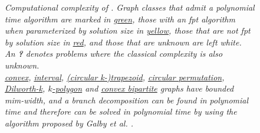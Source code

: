\begin{figure}
    \centering
    \resizebox{1\textwidth}{!}{
        
    }
    \caption[Graph inclusions]{\textit{Computational complexity of \sdom. Graph classes that admit a polynomial time algorithm are marked in {\ul{green}}, those with an fpt algorithm when parameterized by solution size in {\ul{yellow}}, those that are not fpt by solution size in {\ul{red}}, and those that are unknown are left \textit{white}.
    An \textbf{?} denotes problems where the classical complexity is also unknown.\\
    \underline{convex}, \underline{interval}, \underline{(circular k-)trapezoid}, \underline{circular permutation}, \underline{Dilworth-k}, \underline{$k$-polygon} and \underline{convex bipartite} graphs have bounded mim-width, and a branch decomposition can be found in polynomial time \cite{Belmonte2011} and therefore can be solved in polynomial time by using the algorithm proposed by Galby et al. \cite{Galby2020}.
    }}
    
    \label{fig:bigpicture}
\end{figure}